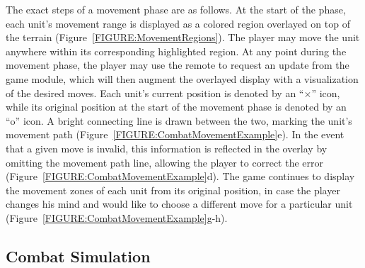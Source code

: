 \documentclass{thesis}
\begin{document}
The exact steps of a movement phase are as follows. At the start of the phase, each unit's movement range is displayed as a colored region overlayed on top of the terrain (Figure~\ref{FIGURE:MovementRegions}). The player may move the unit anywhere within its corresponding highlighted region. At any point during the movement phase, the player may use the remote to request an update from the game module, which will then augment the overlayed display with a visualization of the desired moves. Each unit's current position is denoted by an ``\begin{math}\times\end{math}'' icon, while its original position at the start of the movement phase is denoted by an ``o'' %
icon. A bright connecting line is drawn between the two, marking the unit's movement path (Figure~\ref{FIGURE:CombatMovementExample}e). In the event that a given move is invalid, this information is reflected in the overlay by omitting the movement path line, allowing the player to correct the error (Figure~\ref{FIGURE:CombatMovementExample}d). The game continues to display the movement zones of each unit from its original position, in case the player changes his mind and would like to choose a different move for a particular unit (Figure~\ref{FIGURE:CombatMovementExample}g-h).

\subsection{Combat Simulation}
\label{SECTION:CombatSimulation}
\end{document}

